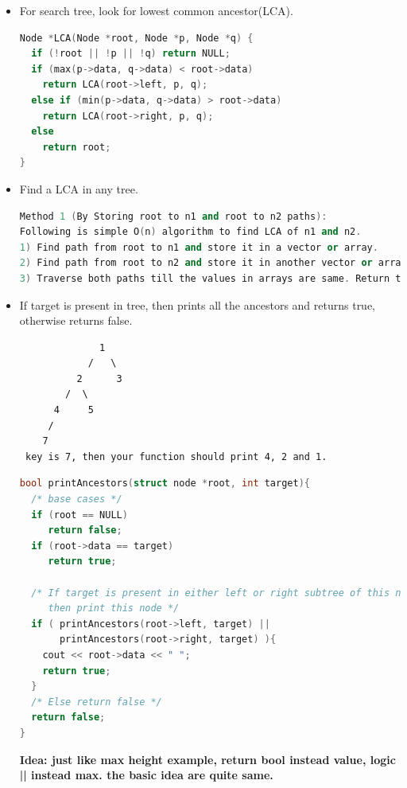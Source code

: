 \documentclass[a4paper,12pt,twoside]{book}
\begin{document}
\begin{itemize}
\item For search tree, look for lowest common ancestor(LCA). 
\begin{lstlisting}[frame=single, language=c++]
Node *LCA(Node *root, Node *p, Node *q) {
  if (!root || !p || !q) return NULL;
  if (max(p->data, q->data) < root->data)
    return LCA(root->left, p, q);
  else if (min(p->data, q->data) > root->data)
    return LCA(root->right, p, q);
  else
    return root;
}

\end{lstlisting}

\item Find a LCA in any tree. 

\begin{lstlisting}[frame=single, language=c++]
Method 1 (By Storing root to n1 and root to n2 paths):
Following is simple O(n) algorithm to find LCA of n1 and n2.
1) Find path from root to n1 and store it in a vector or array.
2) Find path from root to n2 and store it in another vector or array.
3) Traverse both paths till the values in arrays are same. Return the common element just before the mismatch.
\end{lstlisting}

\item  If target is present in tree, then prints all the ancestors and returns true, otherwise returns false. 
\begin{verbatim}
              1
            /   \
          2      3
        /  \
      4     5
     /
    7
 key is 7, then your function should print 4, 2 and 1.
\end{verbatim}

\begin{lstlisting}[frame=single, language=c++]
bool printAncestors(struct node *root, int target){
  /* base cases */
  if (root == NULL)
     return false;
  if (root->data == target)
     return true;
     
  /* If target is present in either left or right subtree of this node,
     then print this node */
  if ( printAncestors(root->left, target) ||
       printAncestors(root->right, target) ){
    cout << root->data << " ";
    return true;
  }
  /* Else return false */
  return false;
}
\end{lstlisting}
\textbf{Idea: just like max height example, return bool instead value, logic || instead max. the basic idea are quite same. }

\end{itemize}
\end{document}
